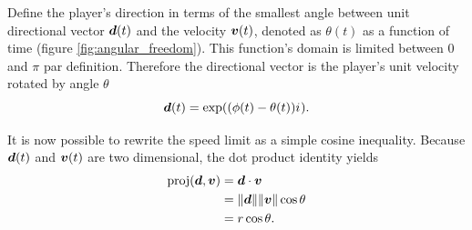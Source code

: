 Define the player's direction in terms of the smallest angle between unit directional vector $\boldsymbol{d}(t)$ and the velocity $\boldsymbol{v}(t)$, denoted as $\theta(t)$ as a function of time (figure \ref{fig:angular_freedom}). This function's domain is limited between $0$ and $\pi$ par definition. Therefore the directional vector is the player's unit velocity rotated by angle $\theta$
\[
    \boldsymbol{d}(t) = \exp((\phi(t) - \theta(t)) {i\mkern1mu}).
\]


%
It is now possible to rewrite the speed limit as a simple cosine inequality. Because $\boldsymbol{d}(t)$ and $\boldsymbol{v}(t)$ are two dimensional, the dot product identity yields
\begin{align*}
    \text{proj}(\boldsymbol{d}, \boldsymbol{v}) &= \boldsymbol{d} \cdot \boldsymbol{v}\\
    &= \|\boldsymbol{d}\| \|\boldsymbol{v}\| \cos \theta\\
    &= r \cos \theta.
\end{align*}



